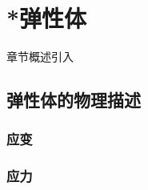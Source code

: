 \chapter{*弹性体}\label{8}

章节概述引入

\section{弹性体的物理描述}\label{8-1}

\subsection{应变}\label{8-1-1}

\subsection{应力}\label{8-1-2}
